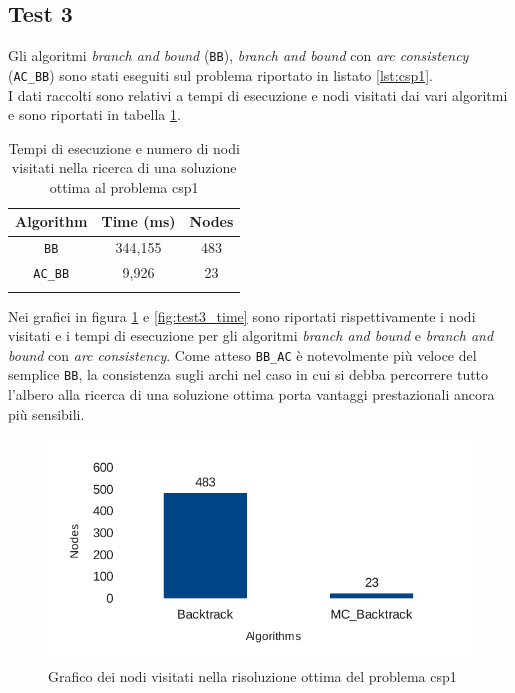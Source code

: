 \documentclass[10pt, a4paper]{article}
\begin{document}
\subsection{Test 3}
Gli algoritmi \textit{branch and bound} (\texttt{BB}), \textit{branch and bound} con \textit{arc consistency} (\texttt{AC\_BB}) sono stati eseguiti sul problema riportato in listato \ref{lst:csp1}.\\
I dati raccolti sono relativi a tempi di esecuzione e nodi visitati dai vari algoritmi e sono riportati in tabella \ref{tab:test2}.

\begin{longtable}{c c c}
\toprule
\textbf{Algorithm} & \textbf{Time (ms)} & \textbf{Nodes}\\
\midrule
\texttt{BB} & 344,155 & 483 \\
\midrule
\texttt{AC\_BB} & 9,926 & 23 \\
\bottomrule
\caption{Tempi di esecuzione e numero di nodi visitati nella ricerca di una soluzione ottima al problema csp1}
\label{tab:test2}
\end{longtable}

Nei grafici in figura \ref{fig:test3_nodes} e \ref{fig:test3_time} sono riportati rispettivamente i nodi visitati e i tempi di esecuzione per gli algoritmi \textit{branch and bound} e \textit{branch and bound} con \textit{arc consistency}. Come atteso \texttt{BB\_AC} è notevolmente più veloce del semplice \texttt{BB}, la consistenza sugli archi nel caso in cui si debba percorrere tutto l'albero alla ricerca di una soluzione ottima porta vantaggi prestazionali ancora più sensibili.

\begin{figure}[!h]
\begin{center}
\includegraphics[scale=0.7]{./report-images/test3_nodes.pdf}
\caption{Grafico dei nodi visitati nella risoluzione ottima del problema csp1}
\label{fig:test3_nodes}
\end{center}
\end{figure}
\end{document}
